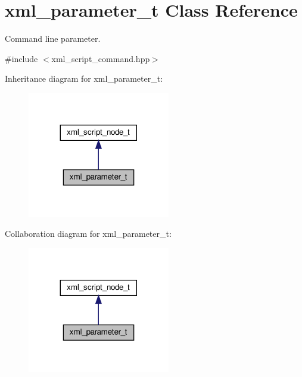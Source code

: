 \hypertarget{classxml__parameter__t}{}\section{xml\+\_\+parameter\+\_\+t Class Reference}
\label{classxml__parameter__t}


Command line parameter.  




{\ttfamily \#include $<$xml\+\_\+script\+\_\+command.\+hpp$>$}



Inheritance diagram for xml\+\_\+parameter\+\_\+t\+:
\nopagebreak
\begin{figure}[H]
\begin{center}
\leavevmode
\includegraphics[width=176pt]{d6/d76/classxml__parameter__t__inherit__graph}
\end{center}
\end{figure}


Collaboration diagram for xml\+\_\+parameter\+\_\+t\+:
\nopagebreak
\begin{figure}[H]
\begin{center}
\leavevmode
\includegraphics[width=176pt]{d0/dd3/classxml__parameter__t__coll__graph}
\end{center}
\end{figure}
